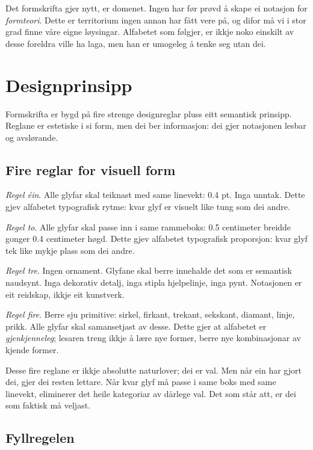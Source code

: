 \documentclass[a4paper,11pt]{article}
\begin{document}
Det formskrifta gjer nytt, er domenet. Ingen har før prøvd å skape ei notasjon for \emph{formteori}. Dette er territorium ingen annan har fått vere på, og difor må vi i stor grad finne våre eigne løysingar. Alfabetet som følgjer, er ikkje noko einskilt av desse foreldra ville ha laga, men han er umogeleg å tenke seg utan dei.


\section{Designprinsipp}

Formskrifta er bygd på fire strenge designreglar pluss eitt semantisk prinsipp. Reglane er estetiske i si form, men dei ber informasjon: dei gjer notasjonen lesbar og avslørande.

\subsection{Fire reglar for visuell form}

\begin{quoting}
\emph{Regel éin}. Alle glyfar skal teiknast med same linevekt: 0.4 pt. Inga unntak. Dette gjev alfabetet typografisk rytme: kvar glyf er visuelt like tung som dei andre.

\emph{Regel to}. Alle glyfar skal passe inn i same rammeboks: 0.5 centimeter breidde gonger 0.4 centimeter høgd. Dette gjev alfabetet typografisk proporsjon: kvar glyf tek like mykje plass som dei andre.

\emph{Regel tre}. Ingen ornament. Glyfane skal berre innehalde det som er semantisk naudsynt. Inga dekorativ detalj, inga stipla hjelpelinje, inga pynt. Notasjonen er eit reidskap, ikkje eit kunstverk.

\emph{Regel fire}. Berre sju primitive: sirkel, firkant, trekant, sekskant, diamant, linje, prikk. Alle glyfar skal samansetjast av desse. Dette gjer at alfabetet er \emph{gjenkjenneleg}; lesaren treng ikkje å lære nye former, berre nye kombinasjonar av kjende former.
\end{quoting}

Desse fire reglane er ikkje absolutte naturlover; dei er val. Men når ein har gjort dei, gjer dei resten lettare. Når kvar glyf må passe i same boks med same linevekt, eliminerer det heile kategoriar av dårlege val. Det som står att, er dei som faktisk må veljast.

\subsection{Fyllregelen}
\end{document}
